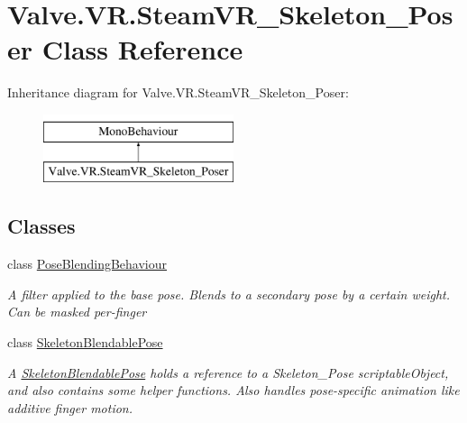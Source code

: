 \hypertarget{class_valve_1_1_v_r_1_1_steam_v_r___skeleton___poser}{}\section{Valve.\+V\+R.\+Steam\+V\+R\+\_\+\+Skeleton\+\_\+\+Poser Class Reference}
\label{class_valve_1_1_v_r_1_1_steam_v_r___skeleton___poser}
Inheritance diagram for Valve.\+V\+R.\+Steam\+V\+R\+\_\+\+Skeleton\+\_\+\+Poser\+:\begin{figure}[H]
\begin{center}
\leavevmode
\includegraphics[height=2.000000cm]{class_valve_1_1_v_r_1_1_steam_v_r___skeleton___poser}
\end{center}
\end{figure}
\subsection*{Classes}
\begin{DoxyCompactItemize}
\item 
class \mbox{\hyperlink{class_valve_1_1_v_r_1_1_steam_v_r___skeleton___poser_1_1_pose_blending_behaviour}{Pose\+Blending\+Behaviour}}
\begin{DoxyCompactList}\small\item\em A filter applied to the base pose. Blends to a secondary pose by a certain weight. Can be masked per-\/finger \end{DoxyCompactList}\item 
class \mbox{\hyperlink{class_valve_1_1_v_r_1_1_steam_v_r___skeleton___poser_1_1_skeleton_blendable_pose}{Skeleton\+Blendable\+Pose}}
\begin{DoxyCompactList}\small\item\em A \mbox{\hyperlink{class_valve_1_1_v_r_1_1_steam_v_r___skeleton___poser_1_1_skeleton_blendable_pose}{Skeleton\+Blendable\+Pose}} holds a reference to a Skeleton\+\_\+\+Pose scriptable\+Object, and also contains some helper functions. Also handles pose-\/specific animation like additive finger motion. \end{DoxyCompactList}\end{DoxyCompactItemize}
